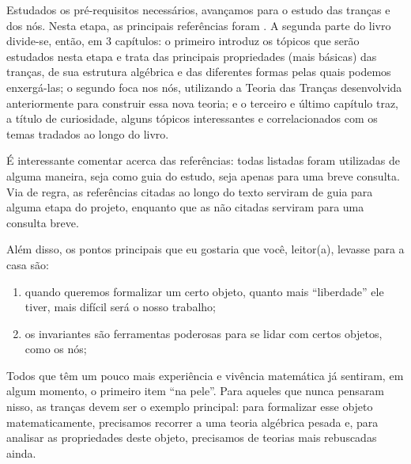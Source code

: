     Estudados os pré-requisitos necessários, avançamos
    para o estudo das tranças e dos nós. Nesta etapa,
    as principais referências foram 
    \cite{knot-book, Livro-do-Margalit, Livro-do-Kunio}.
    A segunda parte do livro divide-se, então, em 3 capítulos:
    o primeiro introduz os tópicos que serão estudados nesta etapa e
    trata das principais propriedades (mais básicas)
    das tranças, de sua estrutura algébrica e das diferentes formas
    pelas quais podemos enxergá-las;
    o segundo foca nos nós, utilizando a Teoria das Tranças
    desenvolvida anteriormente para construir essa nova teoria;
    e o terceiro e último capítulo traz, a título de curiosidade, 
    alguns tópicos interessantes e correlacionados com os temas
    tradados ao longo do livro.
    
    É interessante comentar acerca das referências:
    todas listadas foram utilizadas de alguma maneira, seja
    como guia do estudo, seja apenas para uma breve consulta.
    Via de regra, as referências citadas ao longo do texto
    serviram de guia para alguma etapa do projeto, enquanto que
    as não citadas serviram para uma consulta breve.
    
    Além disso,
    os pontos principais que eu gostaria que você, leitor(a), levasse para a casa são:
    \begin{enumerate}
        \item quando queremos formalizar um certo objeto, quanto mais ``liberdade'' ele tiver, mais difícil
        será o nosso trabalho;
        \item os invariantes são ferramentas poderosas para se lidar com certos objetos, como os nós;
    \end{enumerate}
    \par Todos que têm um pouco mais experiência e vivência matemática já sentiram, 
    em algum momento, o primeiro item ``na pele''. Para aqueles que nunca pensaram nisso, as tranças 
    devem ser o exemplo principal:
    para formalizar esse objeto matematicamente, precisamos recorrer a uma teoria algébrica pesada e, 
    para analisar as propriedades deste objeto, precisamos de teorias mais rebuscadas ainda.
    
